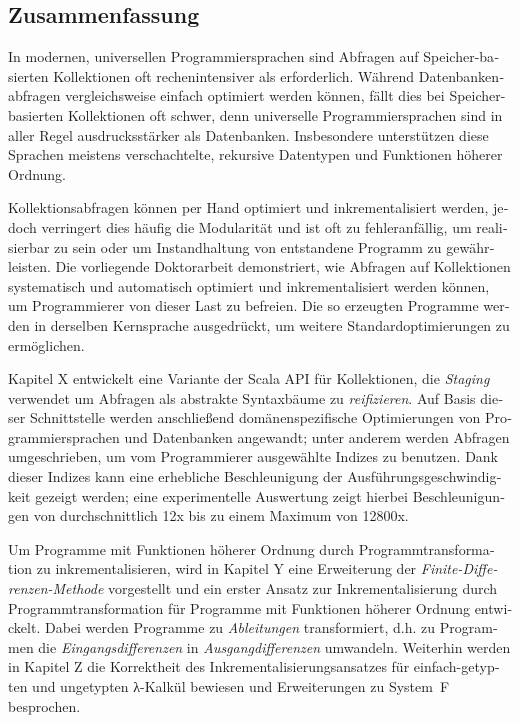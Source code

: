 \begin{otherlanguage}{ngerman}
\chapter{Zusammenfassung}

In modernen, universellen Programmiersprachen sind Abfragen auf
Speicher-basierten Kollektionen oft rechenintensiver als erforderlich. Während
Datenbankenabfragen vergleichsweise einfach optimiert werden können, fällt dies bei
Speicher-basierten Kollektionen oft schwer, denn universelle
Programmiersprachen sind in aller Regel ausdrucksstärker als
Datenbanken. Insbesondere unterstützen diese Sprachen meistens
verschachtelte, rekursive Datentypen und Funktionen höherer Ordnung.

Kollektionsabfragen können per Hand optimiert und inkrementalisiert
werden, jedoch verringert dies häufig die Modularität und ist oft zu
fehleranfällig, um realisierbar zu sein oder um Instandhaltung von
entstandene Programm zu gewährleisten.
Die vorliegende Doktorarbeit demonstriert, wie Abfragen auf Kollektionen
systematisch und automatisch optimiert und inkrementalisiert werden
können, um Programmierer von dieser Last zu befreien.
%
Die so erzeugten Programme werden in derselben Kernsprache ausgedrückt,
um weitere Standardoptimierungen zu ermöglichen.

Kapitel X entwickelt eine Variante der Scala API für
Kollektionen, die \emph{Staging} verwendet um Abfragen als abstrakte
Syntaxbäume zu \emph{reifizieren}.
Auf Basis dieser Schnittstelle werden anschließend domänenspezifische
Optimierungen von Programmiersprachen und Datenbanken angewandt; unter
anderem werden Abfragen umgeschrieben, um vom Programmierer ausgewählte
Indizes zu benutzen. Dank dieser Indizes kann eine erhebliche
Beschleunigung der Ausführungsgeschwindigkeit gezeigt werden; eine
experimentelle Auswertung zeigt hierbei Beschleunigungen von
durchschnittlich 12x bis zu einem Maximum von 12800x.

Um Programme mit Funktionen höherer Ordnung durch
Programmtransformation zu inkrementalisieren, wird in Kapitel Y eine
Erweiterung der \emph{Finite-Differenzen-Methode} vorgestellt
\citep{Paige82FDC,Blakeley:1986:EUM,Gupta99MMV} und ein erster
Ansatz zur Inkrementalisierung durch Programmtransformation für Programme mit
Funktionen höherer Ordnung entwickelt.
%
%
Dabei werden Programme zu \emph{Ableitungen}
transformiert, d.h. zu Programmen die \emph{Eingangsdifferenzen} in
\emph{Ausgangdifferenzen} umwandeln.
Weiterhin werden in Kapitel Z die Korrektheit des
Inkrementalisierungsansatzes für einfach-getypten und ungetypten
λ-Kalkül bewiesen und Erweiterungen zu System~F besprochen.


\end{otherlanguage}
